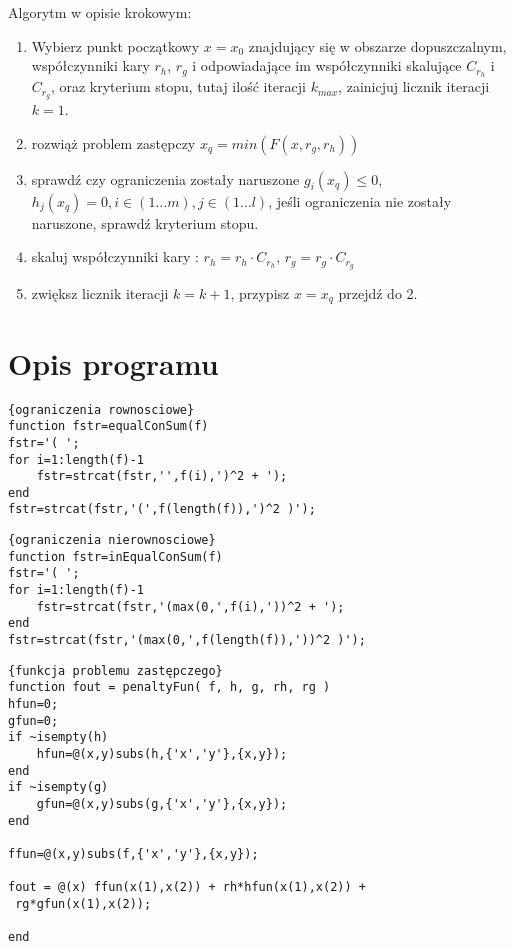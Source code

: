 \documentclass{classrep}
\begin{document}
Algorytm w opisie krokowym:
\begin{enumerate}
\item Wybierz punkt początkowy $x=x_0$ znajdujący się w obszarze dopuszczalnym, współczynniki kary $r_h$, $r_g$ i odpowiadające im współczynniki skalujące $C_{r_h}$ i $C_{r_g}$, oraz kryterium stopu, tutaj ilość iteracji $k_{max}$, zainicjuj licznik iteracji $k=1$.
\item rozwiąż problem zastępczy   $x_q = min \left( F(x,r_g, r_h) \right)$
\item sprawdź czy ograniczenia zostały naruszone $g_i(x_q)\leq0$, $h_j(x_q)=0, i \in \left(1 \dots m \right) , j \in \left(1 \dots l \right)$, jeśli ograniczenia nie zostały naruszone, sprawdź kryterium stopu.
\item skaluj współczynniki kary : $r_h=r_h \cdot C_{r_h}$, $r_g=r_g \cdot C_{r_g}$
\item zwiększ licznik iteracji $k=k+1$, przypisz $x=x_q$ przejdź do 2.
\end{enumerate}

\section{Opis programu}

\begin{lstlisting}{ograniczenia rownosciowe}
function fstr=equalConSum(f)
fstr='( ';
for i=1:length(f)-1
    fstr=strcat(fstr,'',f(i),')^2 + ');
end
fstr=strcat(fstr,'(',f(length(f)),')^2 )');
\end{lstlisting}


\begin{lstlisting}{ograniczenia nierownosciowe}
function fstr=inEqualConSum(f)
fstr='( ';
for i=1:length(f)-1
    fstr=strcat(fstr,'(max(0,',f(i),'))^2 + ');
end
fstr=strcat(fstr,'(max(0,',f(length(f)),'))^2 )');
\end{lstlisting}


\begin{lstlisting}{funkcja problemu zastępczego}
function fout = penaltyFun( f, h, g, rh, rg )
hfun=0;
gfun=0;
if ~isempty(h)
    hfun=@(x,y)subs(h,{'x','y'},{x,y});
end
if ~isempty(g)
    gfun=@(x,y)subs(g,{'x','y'},{x,y});
end

ffun=@(x,y)subs(f,{'x','y'},{x,y});

fout = @(x) ffun(x(1),x(2)) + rh*hfun(x(1),x(2)) +
 rg*gfun(x(1),x(2));

end

\end{lstlisting}
\end{document}
